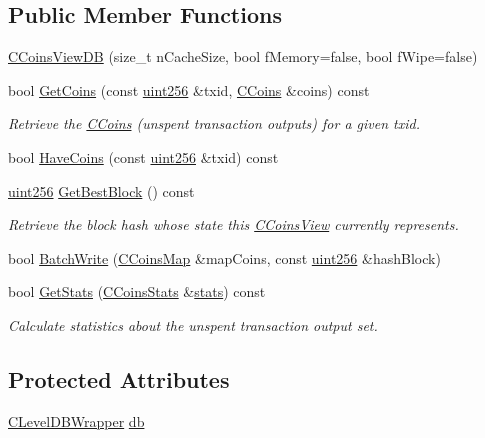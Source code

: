 \subsection*{Public Member Functions}
\begin{DoxyCompactItemize}
\item 
\hyperlink{class_c_coins_view_d_b_a209841b241febcccb2ec584b886ad374}{C\+Coins\+View\+D\+B} (size\+\_\+t n\+Cache\+Size, bool f\+Memory=false, bool f\+Wipe=false)
\item 
bool \hyperlink{class_c_coins_view_d_b_a20655c9c13a6124cdcf210206d518d92}{Get\+Coins} (const \hyperlink{classuint256}{uint256} \&txid, \hyperlink{class_c_coins}{C\+Coins} \&coins) const 
\begin{DoxyCompactList}\small\item\em Retrieve the \hyperlink{class_c_coins}{C\+Coins} (unspent transaction outputs) for a given txid. \end{DoxyCompactList}\item 
bool \hyperlink{class_c_coins_view_d_b_a4d08cf2d3440c1de4e48cfddd67962d7}{Have\+Coins} (const \hyperlink{classuint256}{uint256} \&txid) const 
\item 
\hyperlink{classuint256}{uint256} \hyperlink{class_c_coins_view_d_b_a01777676c2eafd2970a9d53e5fb4a49a}{Get\+Best\+Block} () const 
\begin{DoxyCompactList}\small\item\em Retrieve the block hash whose state this \hyperlink{class_c_coins_view}{C\+Coins\+View} currently represents. \end{DoxyCompactList}\item 
bool \hyperlink{class_c_coins_view_d_b_a33f98ec9323ce48e1704327bc8a2a002}{Batch\+Write} (\hyperlink{coins_8h_a2886ba2fd0428bae777e1cbcabc02834}{C\+Coins\+Map} \&map\+Coins, const \hyperlink{classuint256}{uint256} \&hash\+Block)
\item 
bool \hyperlink{class_c_coins_view_d_b_a6bbe15962b0efd519e30dada872f01c5}{Get\+Stats} (\hyperlink{struct_c_coins_stats}{C\+Coins\+Stats} \&\hyperlink{db__bench_8cc_a5925d216740c89f43482df806fd14e8c}{stats}) const 
\begin{DoxyCompactList}\small\item\em Calculate statistics about the unspent transaction output set. \end{DoxyCompactList}\end{DoxyCompactItemize}
\subsection*{Protected Attributes}
\begin{DoxyCompactItemize}
\item 
\hyperlink{class_c_level_d_b_wrapper}{C\+Level\+D\+B\+Wrapper} \hyperlink{class_c_coins_view_d_b_aba0a7b26fe82c1a2e80ca060d12fb66a}{db}
\end{DoxyCompactItemize}


